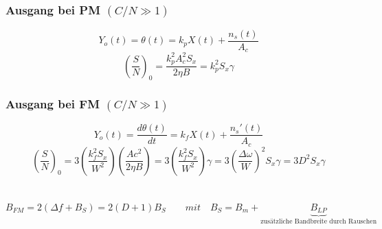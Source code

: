 \subsubsection{Ausgang bei PM $(C/N \gg 1)$ }
$$ Y_o(t) = \theta(t) = k_p X(t) + \frac{n_s(t)}{A_c}$$ 
$$ \left(\dfrac{S}{N}\right)_0 =
\dfrac{k_p^2 A_c^2 S_x}{2 \eta B} = k_p^2 S_x \gamma $$

\subsubsection{Ausgang bei FM $(C/N \gg 1)$ }
$$ Y_o(t) = \frac{d \theta (t)}{dt} = k_f X(t) + \frac{n_s'(t)}{A_c}$$
$$ \left(\dfrac{S}{N}\right)_0 =
3 \left(\dfrac{k_f^2 S_x}{W^2}\right) \left(\dfrac{Ac^2}{2 \eta B}\right)
= 3 \left(\frac{k_f^2 S_x}{W^2}\right) \gamma = 
3 \left(\dfrac{\Delta \omega}{W}\right)^2 S_x \gamma = 3 D^2 S_x \gamma$$ \\ \\

$$B_{FM} = 2(\Delta f + B_S) = 2(D+1)B_S \qquad mit \quad B_S = B_m + \underbrace{B_{LP}}_{\text{zusätzliche Bandbreite durch Rauschen}}$$

